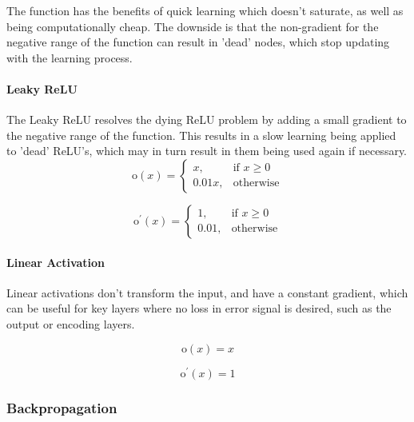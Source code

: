 \documentclass[a4paper,11pt,oneside]{article}
\theoremstyle{plain}
\theoremstyle{definition}
\begin{document}
	The function has the benefits of quick learning which doesn't saturate, as well as being computationally cheap. The downside is that the non-gradient for the negative range of the function can result in 'dead' nodes, which stop updating with the learning process.
	
	\paragraph{Leaky ReLU}
	
	The Leaky ReLU resolves the dying ReLU problem by adding a small gradient to the negative range of the function. This results in a slow learning being applied to 'dead' ReLU's, which may in turn result in them being used again if necessary.
	\begin{equation}\end{equation}\label{func_leaky_relu}
	\[
	\mathrm{o}(x)= 
	\begin{cases}
	x,& \text{if } x\geq 0\\
	0.01x,              & \text{otherwise}
	\end{cases}
	\]
	
	\begin{equation}\end{equation}\label{func_leaky_relu_prime}
	\[
	\mathrm{o}^\prime(x)= 
	\begin{cases}
	1,& \text{if } x\geq 0\\
	0.01,              & \text{otherwise}
	\end{cases}
	\]
	
	\paragraph{Linear Activation}
	
	Linear activations don't transform the input, and have a constant gradient, which can be useful for key layers where no loss in error signal is desired, such as the output or encoding layers.
	
	\begin{equation}\label{func_linear}
	\mathrm{o}(x) = x
	\end{equation}
	
	\begin{equation}\label{func_linear_prime}
	\mathrm{o}^\prime(x) = 1
	\end{equation}
	
	\subsubsection{Backpropagation}\label{imp_backprop}
	
\end{document}
